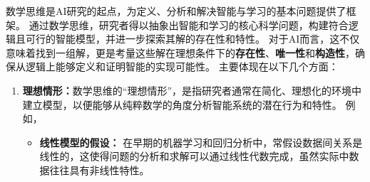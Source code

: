 数学思维是AI研究的起点，为定义、分析和解决智能与学习的基本问题提供了框架。
通过数学思维，研究者得以抽象出智能和学习的核心科学问题，构建符合逻辑且可行的智能模型，并进一步探索其解的存在性和特性。
对于AI而言，这不仅意味着找到一组解，更是考量这些解在理想条件下的{\bf 存在性}、{\bf 唯一性}和{\bf 构造性}，确保从逻辑上能够定义和证明智能的实现可能性。
主要体现在以下几个方面：
\begin{enumerate}
\item {\bf 理想情形：}数学思维的“理想情形”，是指研究者通常在简化、理想化的环境中建立模型，以便能够从纯粹数学的角度分析智能系统的潜在行为和特性。
例如，
\begin{itemize}
\item {\bf 线性模型的假设：} 在早期的机器学习和回归分析中，常假设数据间关系是线性的，这使得问题的分析和求解可以通过线性代数完成，虽然实际中数据往往具有非线性特性。



\end{itemize}
\end{enumerate}
